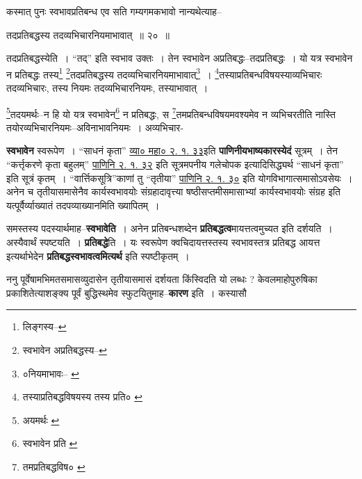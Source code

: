 \documentclass[article,12pt,a4paper]{memoir}
\begin{document}
	  \pstart कस्मात् पुनः स्वभावप्रतिबन्ध एव सति गम्यगमकभावो नान्यथेत्याह--
	\pend
       
	  \bigskip
	  \begingroup
	

	  \pstart तदप्रतिबद्धस्य तदव्यभिचारनियमाभावात् ॥ २० ॥
	\pend
      
	  \endgroup
	 

	  \pstart तदप्रतिबद्धस्येति । “तद्” इति स्वभाव उक्तः । तेन स्वभावेन अप्रतिबद्धः--तदप्रतिबद्धः । यो यत्र स्वभावेन न प्रतिबद्धः तस्य\footnote{लिङ्गस्य--\cite{dp-msD-n}} \footnote{स्वभावेन अप्रतिबद्धस्य--\cite{dp-msD-n}}तदप्रतिबद्धस्य तदव्यभिचारनियमाभावात्\footnote{०नियमाभावः--\cite{dp-msA} \cite{dp-edP} \cite{dp-edH} \cite{dp-edE}} । \footnote{तस्याप्रतिबद्धविषयस्य \cite{dp-msA} \cite{dp-edP} \cite{dp-edH} तस्य प्रति० \cite{dp-edN}}तस्याप्रतिबन्धविषयस्याव्यभिचारः तदव्यभिचारः, तस्य नियमः तदव्यभिचारनियमः, तस्याभावात् ।
	\pend
       

	  \pstart \footnote{अयमर्थः \cite{dp-msA} \cite{dp-msB} \cite{dp-msC} \cite{dp-msD} \cite{dp-edP} \cite{dp-edH} \cite{dp-edE} \cite{dp-edN}}तदयमर्थः--न हि यो यत्र स्वभावेन\footnote{स्वभावेन प्रति \cite{dp-msB}} न प्रतिबद्धः, स \footnote{तमप्रतिबद्धविष० \cite{dp-msA} \cite{dp-edP} \cite{dp-edH}}तमप्रतिबन्धविषयमवश्यमेव न व्यभिचरतीति नास्ति तयोरव्यभिचारनियमः--अविनाभावनियमः । अव्यभिचार-
	\pend
      
	  \endgroup
	

	  \pstart \textbf{स्वभावेन} स्वरूपेण । “साधनं कृता” \href{http://http://sarit.indology.info/?cref=vk-mbh.2.1.33}{व्या० महा० २. १. ३३}इति \textbf{पाणिनीयभाष्यकारस्येदं} सूत्रम् । तेन “कर्त्तृकरणे कृता बहुलम्” \href{http://http://sarit.indology.info/?cref=Pā.2.1.32}{पाणिनि २. १. ३२} इति सूत्रमपनीय गलेचोपक इत्यादिसिद्ध्यर्थ “साधनं कृता” इति सूत्रं कृतम् । “वार्त्तिकसूत्रि”काणां तु “तृतीया” \href{http://http://sarit.indology.info/?cref=Pā.2.1.30}{पाणिनि
	    २. १. ३०} इति योगविभागात्समासोऽवसेयः । अनेन च तृतीयासमासेनैव कार्यस्वभावयोः संग्रहादावृत्त्या षष्ठीसप्तमीसमासाभ्यां कार्यस्वभावयोः संग्रह इति यत्पूर्वैर्व्याख्यातं तदपव्याख्यानमिति ख्यापितम् ।
	\pend
      

	  \pstart समस्तस्य पदस्यार्थमाह--\textbf{स्वभावेति} । अनेन प्रतिबन्धशब्देन \textbf{प्रतिबद्धत्व}मायत्तत्वमुच्यत इति दर्शयति । अस्यैवार्थं स्पष्टयति । \textbf{प्रतिबद्धे}ति । यः स्वरूपेण क्वचिदायत्तस्तस्य स्वभावस्तत्र प्रतिबद्ध आयत्त इत्यर्थाभेदेन \textbf{प्रतिबद्धस्वभावत्वमित्यर्थ} इति स्पष्टीकृतम् ।
	\pend
      

	  \pstart ननु पूर्वेषामभिमतसमासव्युदासेन तृतीयासमासं दर्शयता किंस्विदति यो लब्धः ? केवलमाहोपुरुषिका प्रकाशितेत्याशङ्क्य पूर्वं बुद्धिस्थमेव स्फुटयितुमाह--\textbf{कारण} इति । कस्यासौ
	\pend
      \leavevmode{}
	  \bigskip
	  \begingroup
	
\end{document}
